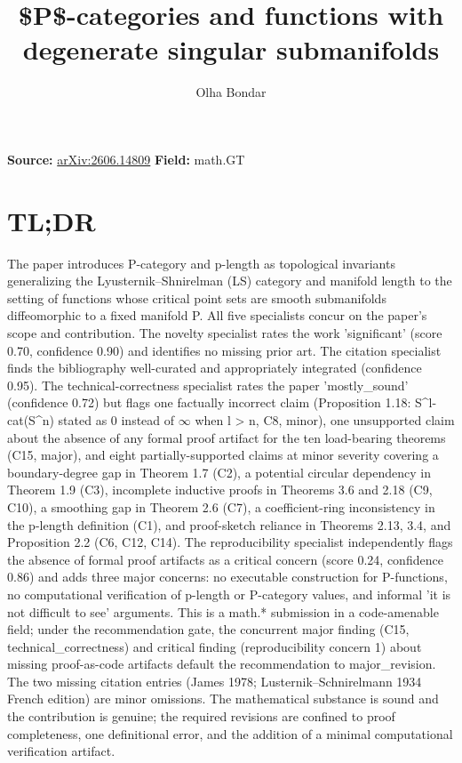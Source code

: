 \documentclass[11pt]{article}
\title{\$P\$-categories and functions with degenerate singular submanifolds}
\author{Olha Bondar}
\date{}
\begin{document}
\maketitle

\noindent\textbf{Source:} \href{https://arxiv.org/abs/2606.14809}{arXiv:2606.14809} \quad \textbf{Field:} math.GT\\

\section*{TL;DR}
The paper introduces P-category and p-length as topological invariants generalizing the Lyusternik--Shnirelman (LS) category and manifold length to the setting of functions whose critical point sets are smooth submanifolds diffeomorphic to a fixed manifold P. All five specialists concur on the paper's scope and contribution. The novelty specialist rates the work 'significant' (score 0.70, confidence 0.90) and identifies no missing prior art. The citation specialist finds the bibliography well-curated and appropriately integrated (confidence 0.95). The technical-correctness specialist rates the paper 'mostly\_sound' (confidence 0.72) but flags one factually incorrect claim (Proposition 1.18: S\^{}l-cat(S\^{}n) stated as 0 instead of \ensuremath{\infty} when l > n, C8, minor), one unsupported claim about the absence of any formal proof artifact for the ten load-bearing theorems (C15, major), and eight partially-supported claims at minor severity covering a boundary-degree gap in Theorem 1.7 (C2), a potential circular dependency in Theorem 1.9 (C3), incomplete inductive proofs in Theorems 3.6 and 2.18 (C9, C10), a smoothing gap in Theorem 2.6 (C7), a coefficient-ring inconsistency in the p-length definition (C1), and proof-sketch reliance in Theorems 2.13, 3.4, and Proposition 2.2 (C6, C12, C14). The reproducibility specialist independently flags the absence of formal proof artifacts as a critical concern (score 0.24, confidence 0.86) and adds three major concerns: no executable construction for P-functions, no computational verification of p-length or P-category values, and informal 'it is not difficult to see' arguments. This is a math.* submission in a code-amenable field; under the recommendation gate, the concurrent major finding (C15, technical\_correctness) and critical finding (reproducibility concern 1) about missing proof-as-code artifacts default the recommendation to major\_revision. The two missing citation entries (James 1978; Lusternik--Schnirelmann 1934 French edition) are minor omissions. The mathematical substance is sound and the contribution is genuine; the required revisions are confined to proof completeness, one definitional error, and the addition of a minimal computational verification artifact.
\end{document}
